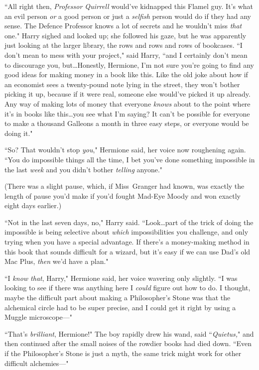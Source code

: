 ``All right then, \emph{Professor Quirrell} would've kidnapped this Flamel guy. It's what an evil person \emph{or} a good person or just a \emph{selfish} person would do if they had any sense. The Defence Professor knows a lot of secrets and he wouldn't miss \emph{that} one." Harry sighed and looked up; she followed his gaze, but he was apparently just looking at the larger library, the rows and rows and rows of bookcases. ``I don't mean to mess with your project," said Harry, ``and I certainly don't mean to discourage you, but…Honestly, Hermione, I'm not sure you're going to find any good ideas for making money in a book like this. Like the old joke about how if an economist sees a twenty-pound note lying in the street, they won't bother picking it up, because if it were real, someone else would've picked it up already. Any way of making lots of money that everyone \emph{knows} about to the point where it's in books like this…you see what I'm saying? It can't be possible for everyone to make a thousand Galleons a month in three easy steps, or everyone would be doing it."

``So? That wouldn't stop \emph{you}," Hermione said, her voice now roughening again. ``You do impossible things all the time, I bet you've done something impossible in the last \emph{week} and you didn't bother \emph{telling} anyone."

(There was a slight pause, which, if Miss~Granger had known, was exactly the length of pause you'd make if you'd fought Mad-Eye Moody and won exactly eight days earlier.)

``Not in the last seven days, no," Harry said. ``Look…part of the trick of doing the impossible is being selective about \emph{which} impossibilities you challenge, and only trying when you have a special advantage. If there's a money-making method in this book that sounds difficult for a wizard, but it's easy if we can use Dad's old Mac Plus, \emph{then} we'd have a plan."

``I \emph{know that}, Harry," Hermione said, her voice wavering only slightly. ``I was looking to see if there was anything here I \emph{could} figure out how to do. I thought, maybe the difficult part about making a Philosopher's Stone was that the alchemical circle had to be super precise, and I could get it right by using a Muggle microscope—"

``That's \emph{brilliant}, Hermione!" The boy rapidly drew his wand, said ``\emph{Quietus,}" and then continued after the small noises of the rowdier books had died down. ``Even if the Philosopher's Stone is just a myth, the same trick might work for other difficult alchemies—"

